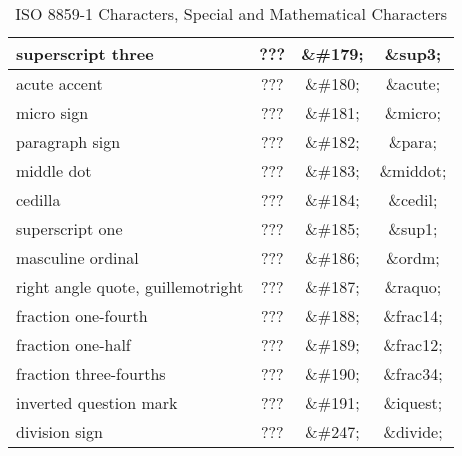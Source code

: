 \begin{table}[htbp]
\begin{center}
\begin{tabular}{lc>{\ttfamily}c>{\ttfamily}c}
      superscript three                 & ???        & \&\#179; & \&sup3; \\
      \hline
      acute accent                      & ???        & \&\#180; & \&acute; \\
      micro sign                        & ???        & \&\#181; & \&micro; \\
      paragraph sign                    & ???        & \&\#182; & \&para; \\
      middle dot                        & ???        & \&\#183; & \&middot; \\
      \hline
      cedilla                           & ???        & \&\#184; & \&cedil; \\
      superscript one                   & ???        & \&\#185; & \&sup1; \\
      masculine ordinal                 & ???        & \&\#186; & \&ordm; \\
      right angle quote, guillemotright & ???        & \&\#187; & \&raquo; \\
      \hline
      fraction one-fourth               & ???        & \&\#188; & \&frac14; \\
      fraction one-half                 & ???        & \&\#189; & \&frac12; \\
      fraction three-fourths            & ???        & \&\#190; & \&frac34; \\
      inverted question mark            & ???        & \&\#191; & \&iquest; \\
      \hline
      division sign                       & ??? & \&\#247; & \&divide; \\
    \end{tabular}
    
    \caption{ISO 8859-1 Characters, Special and Mathematical Characters}
    \label{t:ISO8859-1:special}
  \end{center}
\end{table}

